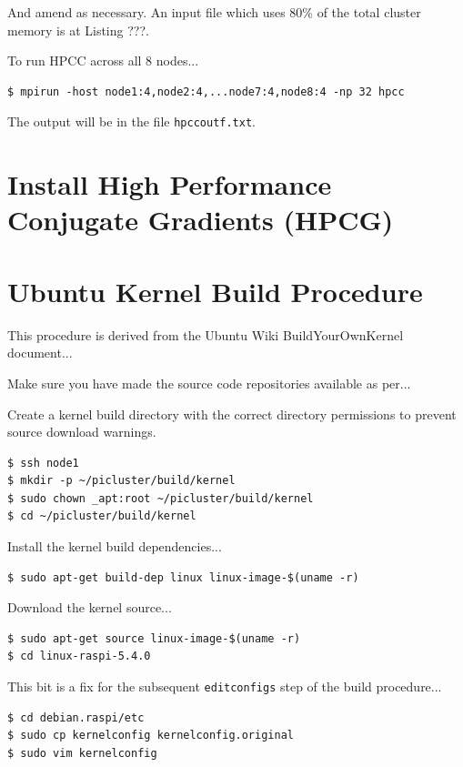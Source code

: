 \documentclass{report}
\begin{document}
And amend as necessary. An input file which uses 80\% of the total cluster memory is at Listing ???.

To run HPCC across all 8 nodes...

\lstset{style=type}
\begin{lstlisting}
$ mpirun -host node1:4,node2:4,...node7:4,node8:4 -np 32 hpcc
\end{lstlisting}

The output will be in the file \verb|hpccoutf.txt|.




%
%
\chapter{Install High Performance Conjugate Gradients (HPCG)}


%
%
\chapter{Ubuntu Kernel Build Procedure}

This procedure is derived from the Ubuntu Wiki BuildYourOwnKernel document...

Make sure you have made the source code repositories available as per...

Create a kernel build directory with the correct directory permissions to prevent source download warnings. 

\lstset{style=type}
\begin{lstlisting}
$ ssh node1
$ mkdir -p ~/picluster/build/kernel
$ sudo chown _apt:root ~/picluster/build/kernel
$ cd ~/picluster/build/kernel
\end{lstlisting}

Install the kernel build dependencies...

\lstset{style=type}
\begin{lstlisting}
$ sudo apt-get build-dep linux linux-image-$(uname -r)
\end{lstlisting}

Download the kernel source...

\lstset{style=type}
\begin{lstlisting}
$ sudo apt-get source linux-image-$(uname -r)
$ cd linux-raspi-5.4.0
\end{lstlisting}

This bit is a fix for the subsequent \verb|editconfigs| step of the build procedure...

\lstset{style=type}
\begin{lstlisting}
$ cd debian.raspi/etc
$ sudo cp kernelconfig kernelconfig.original
$ sudo vim kernelconfig
\end{lstlisting}
\end{document}
